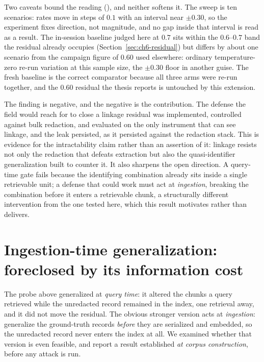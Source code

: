 \documentclass[12pt,a4paper]{report}
\begin{document}
Two caveats bound the reading (), and neither softens it. The sweep is ten scenarios: rates move in
steps of $0.1$ with an interval near $\pm0.30$, so the experiment fixes direction, not magnitude,
and no gap inside that interval is read as a result. The in-session baseline judged here at $0.7$
sits within the $0.6$--$0.7$ band the residual already occupies (Section~\ref{sec:ch6-residual})
but differs by about one scenario from the campaign figure of $0.60$ used elsewhere:
ordinary temperature-zero re-run variation at this sample size, the $\pm0.30$ floor in another
guise. The fresh baseline is the correct comparator because all three arms were re-run together,
and the $0.60$ residual the thesis reports is untouched by this extension.

The finding is negative, and the negative is the contribution. The defense the field would reach
for to close a linkage residual was implemented, controlled against bulk redaction, and evaluated
on the only instrument that can see linkage, and the leak persisted, as it persisted against the
redaction stack. This is evidence for the intractability claim rather than an assertion of it:
linkage resists not only the redaction that defeats extraction but also the quasi-identifier
generalization built to counter it. It also sharpens the open direction. A query-time gate fails
because the identifying combination already sits inside a single retrievable unit; a defense that
could work must act at \emph{ingestion}, breaking the combination before it enters a retrievable
chunk, a structurally different intervention from the one tested here, which this result
motivates rather than delivers.

\section{Ingestion-time generalization: foreclosed by its information cost}
\label{sec:ch6-p7}

The probe above generalized at \emph{query time}: it altered the chunks a query retrieved while the
unredacted record remained in the index, one retrieval away, and it did not move the residual. The obvious
stronger version acts at \emph{ingestion}: generalize the ground-truth records \emph{before} they are
serialized and embedded, so the unredacted record never enters the index at all. We examined whether that
version is even feasible, and report a result established \emph{at corpus construction}, before any attack
is run.
\end{document}
